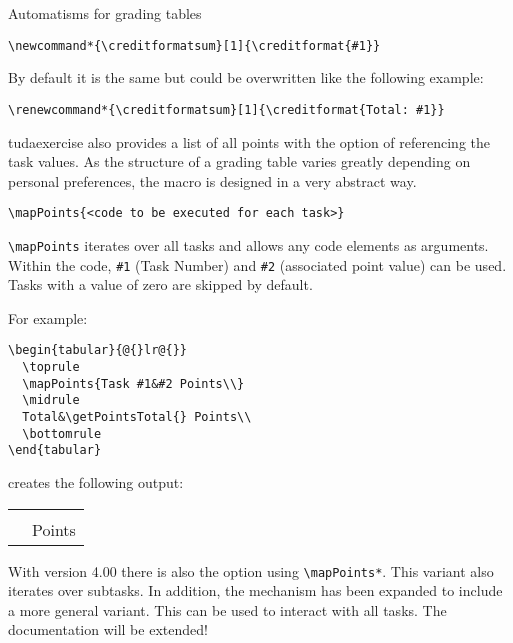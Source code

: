 \documentclass[
	english,%
	accentcolor=9c,%
	points=true, to activate referencing task properties
]{tudaexercise}
\renewcommand*{\creditformatsum}[1]{\creditformat{Total: #1}}
\newcommand*{\code}[1]{\texttt{#1}}
\newcommand*{\cls}[1]{\textsf{#1}}
\let\tbs\textbackslash
\begin{document}
\begin{task}[points=auto]{Automatisms for grading tables}
\begin{subtask}[points=2,title={Summation among subtasks}]
\begin{verbatim}
\newcommand*{\creditformatsum}[1]{\creditformat{#1}}
\end{verbatim}

		By default it is the same but could be overwritten like the following example:

\begin{verbatim}
\renewcommand*{\creditformatsum}[1]{\creditformat{Total: #1}}
\end{verbatim}
	\end{subtask}

	\begin{subtask}[points=3,title={Automatic grading tables}]
		\cls{tudaexercise} also provides a list of all points with the option of referencing the task values.
		As the structure of a grading table varies greatly depending on personal preferences, the macro is designed in a very
		abstract way.

\begin{verbatim}
\mapPoints{<code to be executed for each task>}
\end{verbatim}

		\code{\tbs{}mapPoints} iterates over all tasks and allows any code elements as arguments.
		Within the code, \code{\#1} (Task Number) and \code{\#2} (associated point value) can be used.
		Tasks with a value of zero are skipped by default.

		For example:
\begin{verbatim}
\begin{tabular}{@{}lr@{}}
  \toprule
  \mapPoints{Task #1&#2 Points\\}
  \midrule
  Total&\getPointsTotal{} Points\\
  \bottomrule
\end{tabular}
\end{verbatim}
		creates the following output:\\
		\begin{tabular}{@{}lr@{}}
			\toprule
			\mapPoints{Task #1&#2 Points\\}
			\midrule
			Total&\getPointsTotal{} Points\\
			\bottomrule
		\end{tabular}

	\end{subtask}

	\begin{subtask}[points=5,title={Detailed grading tables including subtasks}]
		With version 4.00 there is also the option using \verb+\mapPoints*+.
		This variant also iterates over subtasks.
		In addition, the mechanism has been expanded to include a more general variant.
		This can be used to interact with all tasks.
		The documentation will be extended!
	\end{subtask}
\end{task}
\end{document}
